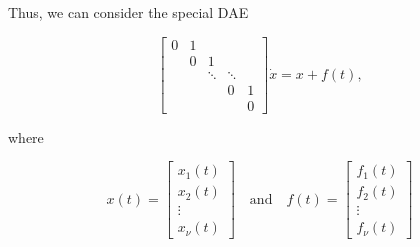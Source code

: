 \documentclass[]{book}
\theoremstyle{definition}
\theoremstyle{definition}
\theoremstyle{definition}
\theoremstyle{remark}
\begin{document}
Thus, we can consider the special DAE

\begin{equation}
\begin{bmatrix}
0 & 1 &        &         &    \\
  & 0 & 1      &         &    \\
  &   & \ddots & \ddots  &    \\
  &   &        & 0       & 1  \\
  &   &        &         & 0 
\end{bmatrix}
\dot x = x + f(t),
\label{eq:spec-dae-rkm-cc}
\end{equation}

where

\[
 x(t) = \begin{bmatrix} x_1(t) \\ x_2(t) \\ \vdots \\ x_\nu(t) \end{bmatrix}
 \quad\text{and}\quad
 f(t) = \begin{bmatrix} f_1(t) \\ f_2(t) \\ \vdots \\ f_\nu(t) \end{bmatrix}
 \]
\end{document}
